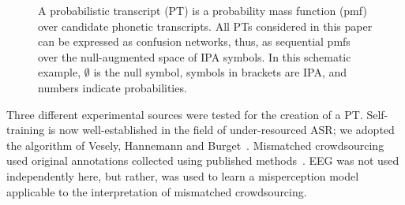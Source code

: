 \begin{figure}
\begin{center}
\end{center}
\vspace*{-2mm}
\caption{A probabilistic transcript (PT) is a probability mass
  function (pmf) over candidate phonetic transcripts.  All PTs
  considered in this paper can be expressed as confusion networks,
  thus, as sequential pmfs over the null-augmented space of IPA
  symbols.  In this schematic example, $\emptyset$ is the null
  symbol, symbols in brackets are IPA, and numbers indicate
  probabilities.}
  \label{fig:pt}
\end{figure}

Three different experimental sources were tested for the creation of a
PT.  Self-training is now well-established in the field of
under-resourced ASR; we adopted the algorithm of Vesely, Hannemann and
Burget~\cite{vesely2013-semi}.  Mismatched crowdsourcing used original
annotations collected using published methods~\cite{JHJ15b}.  EEG was
not used independently here, but rather, was used to learn a
misperception model applicable to the interpretation of mismatched
crowdsourcing.
